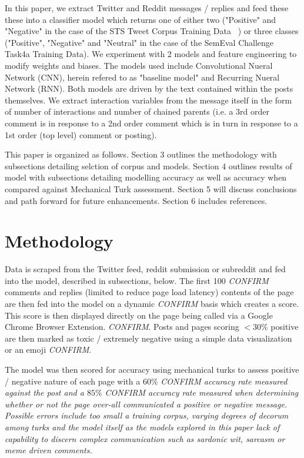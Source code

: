 \documentclass[11pt]{article}
\begin{document}
In this paper, we extract Twitter and Reddit messages / replies
and feed these these into a classifier model which returns one of either two ("Positive" and "Negative" in the case of the STS Tweet Corpus Training Data ~\cite{agarwol:11}) or three classes ("Positive", "Negative" and "Neutral" in the case of the SemEval Challenge Task4a Training Data).
We experiment with 2 models and feature engineering to modify weights
and biases. The models used include Convolutional Nueral Network (CNN),
herein refered to as "baseline model" and Recurring Nueral Network (RNN).
Both models are driven by the text contained within the posts themselves.
We extract interaction variables from the message itself in the form of
number of interactions and number of chained parents (i.e. a 3rd order comment 
is in response to a 2nd order comment which is in turn in response to a 1st order 
(top level) comment or posting).

This paper is organized as follows. Section 3 outlines the methodology with 
subsections detailing selction of corpus and models. Section 4 outlines results
of model with subsections detailing modelling accuracy as well as accuracy when 
compared against Mechanical Turk assessment. Section 5 will discuss conclusions 
and path forward for future enhancements. Section 6 includes references.

\section{Methodology}

Data is scraped from the Twitter feed, reddit submission or subreddit
and fed into the model, described in subsections, below. The first 
100 {\em{CONFIRM}} comments and replies (limited to reduce page load 
latency) contents of the page are then fed into the model on a dynamic 
{\em{CONFIRM}} basis which creates a score. This score is then displayed directly on the page being called via a Google Chrome Browser Extension.
{\em{CONFIRM}}. Posts and pages
scoring \(<30\%\) positive are then marked as toxic / extremely negative
using a simple data visualization or an emoji {\em{CONFIRM}}. 

The model was then scored for accuracy using mechanical turks to
assess positive / negative nature of each page with a 
\(60\%\) \em{CONFIRM} accuracy rate measured against the post and a 
\(85\%\) \em{CONFIRM} accuracy rate measured when determining whether 
or not the page over-all communicated a positive or negative message. Possible 
errors include too small a training corpus, varying degrees of decorum 
among turks and the model itself as the models explored in this paper 
lack of capability to discern complex communication such as sardonic wit, 
sarcasm or meme driven comments.
\end{document}
